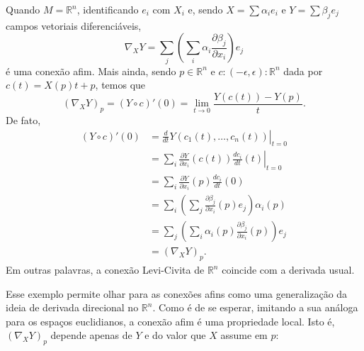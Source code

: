 \begin{example}
    \label{loc:2.1_:_def_2_:_conexão_afim.exemplo}
    Quando $M=\mathbb{R}^{n}$, identificando $e_{i}$ com $X_{i}$ e, sendo $X = \sum\alpha_{i}e_{i}$ e $Y=\sum\beta_{j}e_{j}$ campos vetoriais diferenciáveis,
    \begin{equation*}
        \nabla_{X}Y=\sum_{j}\left( \sum_{i}\alpha_{i}\frac{\partial\beta_{j}}{\partial x_{i}} \right)e_{j}
    \end{equation*}
    é uma conexão afim. Mais ainda, sendo $p \in \mathbb{R}^{n}$ e $c:(-\epsilon,\epsilon):\mathbb{R}^{n}$ dada por $c(t)=X(p)t+p$, temos que
    \begin{equation*}
        (\nabla _{X}Y)_{p}=(Y \circ c)'(0)=\lim_{ t \to 0 } \frac{Y(c(t))-Y(p)}{t}.
    \end{equation*}
    De fato,
    \begin{align*}
        (Y \circ c)'(0) & = \left. \frac{d}{dt} Y(c_1(t), \dots, c_n(t)) \right|_{t=0}                            \\
                        & = \left. \sum_i \frac{\partial Y}{\partial x_i}(c(t)) \frac{dc_i}{dt}(t) \right|_{t=0}  \\
                        & = \sum_i \frac{\partial Y}{\partial x_i}(p) \frac{dc_i}{dt}(0)                          \\
                        & = \sum_i \left( \sum_j \frac{\partial \beta_j}{\partial x_i}(p) e_j \right) \alpha_i(p) \\
                        & = \sum_j \left( \sum_i \alpha_i(p) \frac{\partial \beta_j}{\partial x_i}(p) \right) e_j \\
                        & = (\nabla_{X}Y)_{p}.
    \end{align*}
    Em outras palavras, a conexão Levi-Civita de $\mathbb{R}^{n}$ coincide com a derivada usual.
\end{example}
Esse exemplo permite olhar para as conexões afins como uma generalização da ideia de derivada direcional no $\mathbb{R}^{n}$. Como é de se esperar, imitando a sua análoga para os espaços euclidianos, a conexão afim é uma propriedade local. Isto é, $(\nabla_{X}Y)_{p}$ depende apenas de $Y$ e do valor que $X$ assume em $p$:
